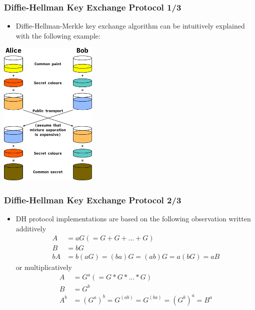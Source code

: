 \documentclass{beamer}
\begin{document}
\begin{frame}
  \frametitle{Diffie-Hellman Key Exchange Protocol 1/3}
  \begin{itemize}
  \item Diffie-Hellman-Merkle key exchange algorithm can be intuitively
    explained with the following example:
  \end{itemize}
  \begin{center}
    \includegraphics[width=0.35\textwidth]{dh}
  \end{center}
\end{frame}

\begin{frame}
  \frametitle{Diffie-Hellman Key Exchange Protocol 2/3}
  \begin{itemize}
  \item DH protocol implementations are based on the following observation
    written additively
    \begin{align*}
      A &= aG (= G + G + ... + G) \\
      B &= bG \\
      bA &= b(aG) = (ba)G = (ab)G = a(bG) = aB
    \end{align*}
    or multiplicatively
    \begin{align*}
      A &= G^a (= G * G * ... * G) \\
      B &= G^b \\
      A^b &= (G^a)^b = G^{(ab)} = G^{(ba)} = (G^b)^a = B^a
    \end{align*}
  \end{itemize}
\end{frame}
\end{document}

